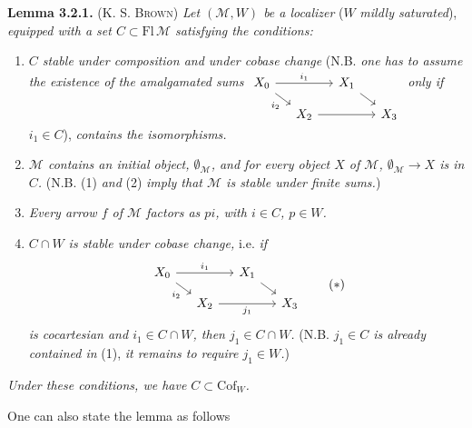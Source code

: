 \documentclass[11pt]{article}
\newcommand{\printedpage}[1]{\marginpar{\footnotesize p.~#1}}
\newcommand{\Cof}{\mathrm{Cof}}
\newcommand{\Fl}{\mathrm{Fl}}
\begin{document}
\textbf{Lemma 3.2.1.} (K. S. \textsc{Brown}) \textit{Let $(\mathcal{M}, W)$ be a localizer} ($W$ \textit{mildly saturated}), \textit{equipped with a set $C \subset \Fl\,\mathcal{M}$ satisfying the conditions:}
\begin{enumerate}
\item[1)] \textit{$C$ stable under composition and under cobase change} (N.B. \textit{one has to assume the existence of the amalgamated sums}
$\begin{tikzcd}[ampersand replacement=\&, baseline=(\tikzcdmatrixname-1-1.base), row sep=small, column sep=small]
X_0 \arrow[rr, "i_1"] \arrow[dr, "i_2"'] \& \& X_1 \arrow[dr] \& \\
\& X_2 \arrow[rr] \& \& X_3
\end{tikzcd}$
\textit{only if $i_1 \in C$}), \textit{contains the isomorphisms.}
\item[2)] \textit{$\mathcal{M}$ contains an initial object, $\emptyset_{\mathcal{M}}$, and for every object $X$ of $\mathcal{M}$, $\emptyset_{\mathcal{M}} \longrightarrow X$ is in $C$.} (N.B. (1) \textit{and} (2) \textit{imply that $\mathcal{M}$ is stable under finite sums.})
\item[3)] \textit{Every arrow $f$ of $\mathcal{M}$ factors as $pi$, with $i \in C$, $p \in W$.}
\item[4)] \textit{$C \cap W$ is stable under cobase change,} i.e. \textit{if}
\[
\begin{tikzcd}[ampersand replacement=\&, row sep=small, column sep=small]
X_0 \arrow[rr, "i_1"] \arrow[dr, "i_2"'] \& \& X_1 \arrow[dr] \& \\
\& X_2 \arrow[rr, "j_1"'] \& \& X_3
\end{tikzcd}
\tag*{$(*)$}
\]
\printedpage{15}
\textit{is cocartesian and $i_1 \in C \cap W$, then $j_1 \in C \cap W$.} (N.B. \textit{$j_1 \in C$ is already contained in} (1), \textit{it remains to require $j_1 \in W$.})
\end{enumerate}
\textit{Under these conditions, we have $C \subset \Cof_W$.}

One can also state the lemma as follows
\end{document}
